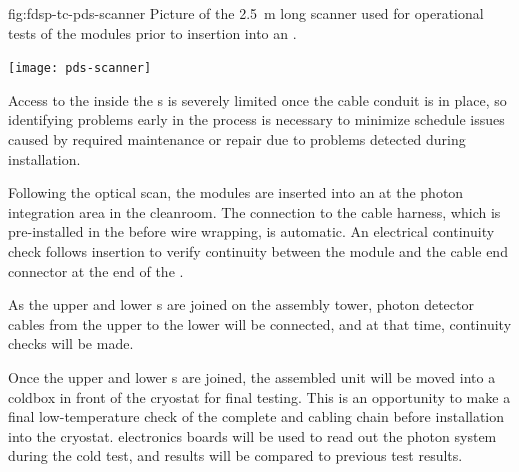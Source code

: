 \begin{dunefigure}{fig:fdsp-tc-pds-scanner}
{Picture of the \SI{2.5}{m} long scanner used for operational tests of the   modules prior to insertion into an .} 

\texttt{[image: pds-scanner]}
\end{dunefigure}

Access to the  inside the s is severely limited once the  cable conduit is in place, so identifying problems early in the process is necessary to minimize schedule issues caused by required  maintenance or repair due to problems detected during installation.

Following the optical scan, the  modules are inserted into an   at the photon integration area in the cleanroom. The connection to the cable harness, which is pre-installed in the  before wire wrapping, is automatic. An electrical continuity check follows insertion to verify  continuity between the  module and the  cable end connector at the end of the .

As the upper and lower s are joined on the assembly tower, photon detector cables from the upper to the lower  will be connected, and at that time, continuity checks will be made.

Once the upper and lower s are joined, the assembled unit will be moved into a coldbox in front of the cryostat for final testing.  This is an opportunity to make a final low-temperature check of the complete   and cabling chain before installation into the cryostat.    electronics boards will be used to read out the photon system during the cold test, and results will be compared to previous  test results.

